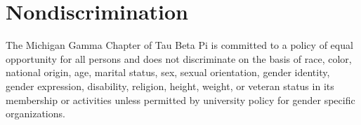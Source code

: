 \section{Nondiscrimination}  The Michigan Gamma Chapter of Tau Beta Pi is committed to a policy of equal opportunity for all persons and does not discriminate on the basis of race, color, national origin, age, marital status, sex, sexual orientation, gender identity, gender expression, disability, religion, height, weight, or veteran status in its membership or activities unless permitted by university policy for gender specific organizations. 
